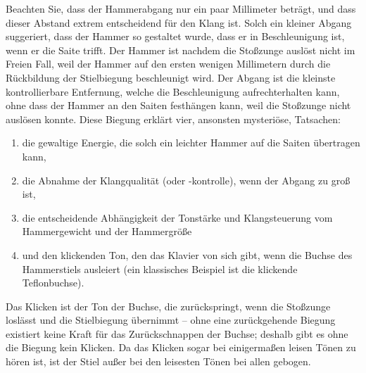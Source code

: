 Beachten Sie, dass der Hammerabgang nur ein paar Millimeter beträgt, und dass dieser Abstand extrem entscheidend für den Klang ist.
Solch ein kleiner Abgang suggeriert, dass der Hammer so gestaltet wurde, dass er in Beschleunigung ist, wenn er die Saite trifft.
Der Hammer ist nachdem die Stoßzunge auslöst nicht im Freien Fall, weil der Hammer auf den ersten wenigen Millimetern durch die Rückbildung der Stielbiegung beschleunigt wird.
Der Abgang ist die kleinste kontrollierbare Entfernung, welche die Beschleunigung aufrechterhalten kann, ohne dass der Hammer an den Saiten festhängen kann, weil die Stoßzunge nicht auslösen konnte.
Diese Biegung erklärt vier, ansonsten mysteriöse, Tatsachen:

\begin{enumerate}[label={\roman*.}] 
\item die gewaltige Energie, die solch ein leichter Hammer auf die Saiten übertragen kann,
\item die Abnahme der Klangqualität (oder -kontrolle), wenn der Abgang zu groß ist,
\item die entscheidende Abhängigkeit der Tonstärke und Klangsteuerung vom Hammergewicht und der Hammergröße
\item und den klickenden Ton, den das Klavier von sich gibt, wenn die Buchse des Hammerstiels ausleiert (ein klassisches Beispiel ist die klickende Teflonbuchse).
\end{enumerate}

Das Klicken ist der Ton der Buchse, die zurückspringt, wenn die Stoßzunge loslässt und die Stielbiegung übernimmt -- ohne eine zurückgehende Biegung existiert keine Kraft für das Zurückschnappen der Buchse; deshalb gibt es ohne die Biegung kein Klicken.
Da das Klicken sogar bei einigermaßen leisen Tönen zu hören ist, ist der Stiel außer bei den leisesten Tönen bei allen gebogen.


